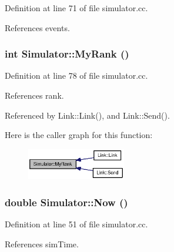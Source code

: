 Definition at line 71 of file simulator.cc.

References events.
\subsubsection[{MyRank}]{\setlength{\rightskip}{0pt plus 5cm}int Simulator::MyRank ()\hspace{0.3cm}{\tt  [static]}}\label{classSimulator_80bffbd51839958866ddd16fde614ecf}




Definition at line 78 of file simulator.cc.

References rank.

Referenced by Link::Link(), and Link::Send().

Here is the caller graph for this function:\nopagebreak
\begin{figure}[H]
\begin{center}
\leavevmode
\includegraphics[width=122pt]{classSimulator_80bffbd51839958866ddd16fde614ecf_icgraph}
\end{center}
\end{figure}
\subsubsection[{Now}]{\setlength{\rightskip}{0pt plus 5cm}double Simulator::Now ()\hspace{0.3cm}{\tt  [static]}}\label{classSimulator_cf5727f517db6743ddf25ae7cc9a8db4}




Definition at line 51 of file simulator.cc.

References simTime.

